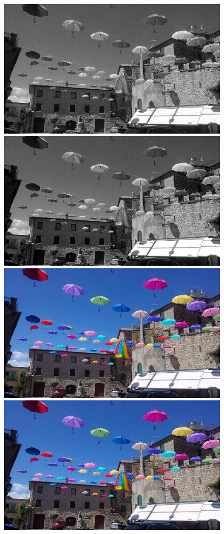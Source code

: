 \documentclass{article}
\begin{document}
	\begin{figure}[!ht]	
	\centering	
	\includegraphics{img/gray-obraz1}	
	\includegraphics{img/arytmetyczne/mnozenie_stala-gray}
	\includegraphics{img/rgb-obraz1}	
	\includegraphics{img/arytmetyczne/mnozenie_stala-rgb}

\end{figure}
\end{document}
